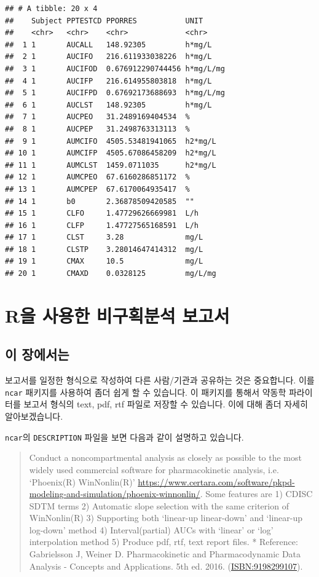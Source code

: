 \documentclass[12pt,]{krantz}
\theoremstyle{definition}
\theoremstyle{definition}
\theoremstyle{definition}
\theoremstyle{remark}
\begin{document}
\begin{verbatim}
## # A tibble: 20 x 4
##    Subject PPTESTCD PPORRES           UNIT     
##    <chr>   <chr>    <chr>             <chr>    
##  1 1       AUCALL   148.92305         h*mg/L   
##  2 1       AUCIFO   216.611933038226  h*mg/L   
##  3 1       AUCIFOD  0.676912290744456 h*mg/L/mg
##  4 1       AUCIFP   216.614955803818  h*mg/L   
##  5 1       AUCIFPD  0.67692173688693  h*mg/L/mg
##  6 1       AUCLST   148.92305         h*mg/L   
##  7 1       AUCPEO   31.2489169404534  %        
##  8 1       AUCPEP   31.2498763313113  %        
##  9 1       AUMCIFO  4505.53481941065  h2*mg/L  
## 10 1       AUMCIFP  4505.67086458209  h2*mg/L  
## 11 1       AUMCLST  1459.0711035      h2*mg/L  
## 12 1       AUMCPEO  67.6160286851172  %        
## 13 1       AUMCPEP  67.6170064935417  %        
## 14 1       b0       2.36878509420585  ""       
## 15 1       CLFO     1.47729626669981  L/h      
## 16 1       CLFP     1.47727565168591  L/h      
## 17 1       CLST     3.28              mg/L     
## 18 1       CLSTP    3.28014647414312  mg/L     
## 19 1       CMAX     10.5              mg/L     
## 20 1       CMAXD    0.0328125         mg/L/mg
\end{verbatim}

\chapter{R을 사용한 비구획분석 보고서}\label{ncar}

\section{이 장에서는}\label{summary-ncar}

보고서를 일정한 형식으로 작성하여 다른 사람/기관과 공유하는 것은
중요합니다. 이를 \texttt{ncar} 패키지를 사용하여 좀더 쉽게 할 수
있습니다. 이 패키지를 통해서 약동학 파라이터를 보고서 형식의 text, pdf,
rtf 파일로 저장할 수 있습니다. 이에 대해 좀더 자세히 알아보겠습니다.

\texttt{ncar}의 \texttt{DESCRIPTION} 파일을 보면 다음과 같이 설명하고
있습니다.

\begin{quote}
Conduct a noncompartmental analysis as closely as possible to the most
widely used commercial software for pharmacokinetic analysis, i.e.
`Phoenix(R) WinNonlin(R)'
\url{https://www.certara.com/software/pkpd-modeling-and-simulation/phoenix-winnonlin/}.
Some features are 1) CDISC SDTM terms 2) Automatic slope selection with
the same criterion of WinNonlin(R) 3) Supporting both `linear-up
linear-down' and `linear-up log-down' method 4) Interval(partial) AUCs
with `linear' or `log' interpolation method 5) Produce pdf, rtf, text
report files. * Reference: Gabrielsson J, Weiner D. Pharmacokinetic and
Pharmacodynamic Data Analysis - Concepts and Applications. 5th ed. 2016.
(\url{ISBN:9198299107}).
\end{quote}
\end{document}
